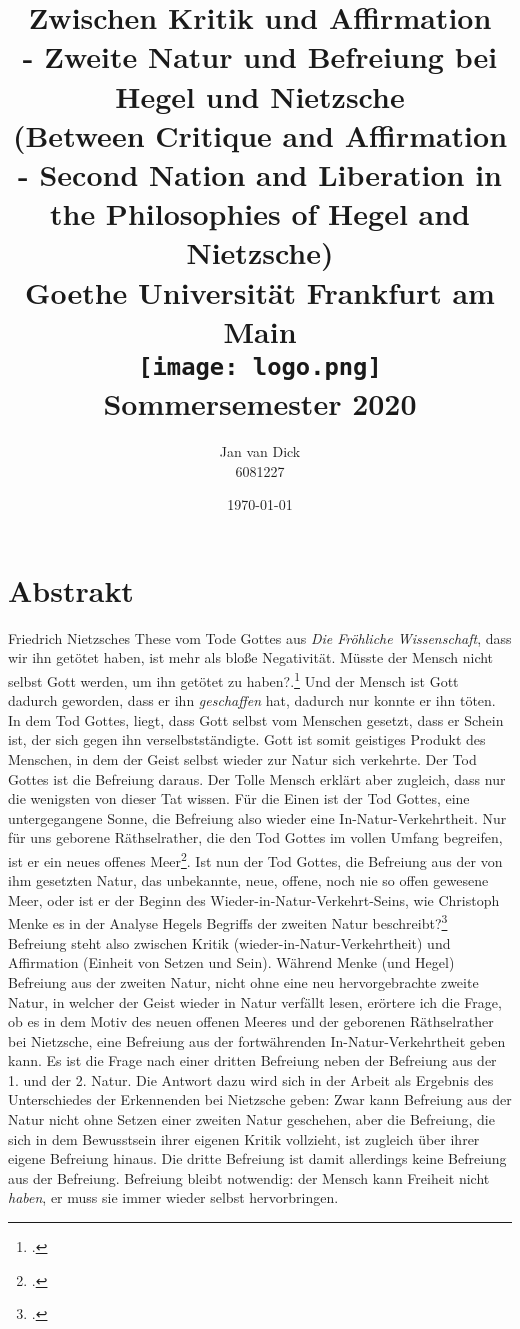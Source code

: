 \documentclass[12pt, a4paper, openany]{report}
\title{
    {Zwischen Kritik und Affirmation}\\ 
    {\large- Zweite Natur und Befreiung bei Hegel und Nietzsche}\\
    {\large(Between Critique and Affirmation - Second Nation and Liberation in the Philosophies of Hegel and Nietzsche)}\\
    {\bigskip}
    {\large Goethe Universität Frankfurt am Main}\\
    {\bigskip}    
    {\bigskip}    
    {\texttt{[image: logo.png]}}\\
    {\bigskip}    
    {Sommersemester 2020}\\
}
\author{
    {Jan van Dick}\\
    {6081227}
}
\date{\today}
\begin{document}
\maketitle
\frontmatter


\chapter*{Abstrakt} 
Friedrich Nietzsches These vom Tode Gottes aus \textit{Die Fröhliche Wissenschaft}, dass \glqq wir\grqq{} ihn getötet haben, ist mehr als bloße Negativität. 
Müsste der Mensch nicht selbst Gott werden, um ihn getötet zu haben?.\footcite[Vgl.][481]{nietzsche_morgenrote_1999} 
Und der Mensch ist Gott dadurch geworden, dass er ihn \textit{geschaffen} hat, dadurch nur konnte er ihn töten. 
In dem Tod Gottes, liegt, dass Gott selbst vom Menschen gesetzt, dass er Schein ist, der sich gegen ihn verselbstständigte.
Gott ist somit geistiges Produkt des Menschen, in dem der Geist selbst wieder zur Natur sich verkehrte.
Der Tod Gottes ist die Befreiung daraus.
Der \glqq Tolle Mensch\grqq{} erklärt aber zugleich, dass nur die wenigsten von dieser Tat wissen. 
Für die Einen ist der Tod Gottes, eine untergegangene Sonne, die Befreiung also wieder eine In-Natur-Verkehrtheit.
Nur für uns \glqq geborene Räthselrather\grqq, die den Tod Gottes im vollen Umfang begreifen, ist er ein \glqq neues offenes Meer\grqq\footcite[][573]{nietzsche_morgenrote_1999}.
Ist nun der Tod Gottes, die Befreiung aus der von ihm gesetzten Natur, das unbekannte, neue, offene, noch nie so offen gewesene Meer, oder ist er der Beginn des Wieder-in-Natur-Verkehrt-Seins, wie Christoph Menke es in der Analyse Hegels Begriffs der zweiten Natur beschreibt?\footcite[Vgl.][144]{menke_autonomie_2018}\\
Befreiung steht also zwischen Kritik (wieder-in-Natur-Verkehrtheit) und Affirmation (Einheit von Setzen und Sein).
Während Menke (und Hegel) Befreiung aus der zweiten Natur, nicht ohne eine neu hervorgebrachte zweite Natur, in welcher der Geist wieder in Natur verfällt lesen, erörtere ich die Frage, ob es in dem Motiv des \glqq neuen offenen Meeres\grqq{} und der \glqq geborenen Räthselrather\grqq{} bei Nietzsche, eine Befreiung aus der fortwährenden In-Natur-Verkehrtheit geben kann.
Es ist die Frage nach einer dritten Befreiung neben der Befreiung aus der 1. und der 2. Natur. 
Die Antwort dazu wird sich in der Arbeit als Ergebnis des Unterschiedes der \glqq Erkennenden\grqq{} bei Nietzsche geben:
Zwar kann Befreiung aus der Natur nicht ohne Setzen einer zweiten Natur geschehen, aber die Befreiung, die sich in dem Bewusstsein ihrer eigenen Kritik vollzieht, ist zugleich über ihrer eigene Befreiung hinaus.
Die dritte Befreiung ist damit allerdings keine Befreiung aus der Befreiung.
Befreiung bleibt notwendig: der Mensch kann Freiheit nicht \textit{haben}, er muss sie immer wieder selbst hervorbringen.
\end{document}
